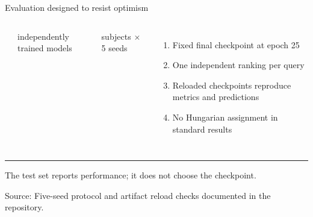 \documentclass[aspectratio=169,11pt]{beamer}
\newcommand{\sourcefooter}[1]{%
  \vfill
  {\color{Muted}\fontsize{8.5}{10}\selectfont Source: #1\par}
}
\begin{document}

\begin{frame}{Evaluation designed to resist optimism}
  \vspace{0.22cm}
  \begin{columns}[T,onlytextwidth]
      {\color{Navy}\bfseries\fontsize{36}{40}\par}
      {\fontsize{17}{21}\selectfont independently trained models\par}
      \vspace{0.18cm}
      {\color{Muted}\fontsize{14}{18} subjects $\times$ 5 seeds
      \par}

      \begin{enumerate}
        \item[\color{Blue}\textbf{01}] Fixed final checkpoint at epoch 25
        \vspace{0.18cm}
        \item[\color{Teal}\textbf{02}] One independent ranking per query
        \vspace{0.18cm}
        \item[\color{Orange}\textbf{03}] Reloaded checkpoints reproduce metrics and predictions
        \vspace{0.18cm}
        \item[\color{Purple}\textbf{04}] No Hungarian assignment in standard results
      \end{enumerate}
  \end{columns}

  \vspace{0.28cm}
  {\color{Line}\rule{\textwidth}{0.8pt}}
  \vspace{0.14cm}
  {\fontsize{14}{18}\selectfont
    The test set reports performance; it does not choose the checkpoint.
  \par}
  \sourcefooter{Five-seed protocol and artifact reload checks documented in the repository.}
\end{frame}

\end{document}
